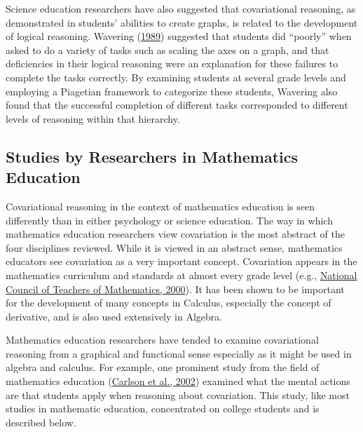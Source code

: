\documentclass[11pt]{umnthesis}
\begin{document}
Science education researchers have also suggested that covariational reasoning, as demonstrated in students' abilities to create graphs, is related to the development of logical reasoning. Wavering (\protect\hyperlink{ref-wavering:1989}{1989}) suggested that students did ``poorly'' when asked to do a variety of tasks such as scaling the axes on a graph, and that deficiencies in their logical reasoning were an explanation for these failures to complete the tasks correctly. By examining students at several grade levels and employing a Piagetian framework to categorize these students, Wavering also found that the successful completion of different tasks corresponded to different levels of reasoning within that hierarchy.

\hypertarget{studies-by-researchers-in-mathematics-education}{%
\subsection{Studies by Researchers in Mathematics Education}\label{studies-by-researchers-in-mathematics-education}}

Covariational reasoning in the context of mathematics education is seen differently than in either psychology or science education. The way in which mathematics education researchers view covariation is the most abstract of the four disciplines reviewed. While it is viewed in an abstract sense, mathematics educators see covariation as a very important concept. Covariation appears in the mathematics curriculum and standards at almost every grade level (e.g., \protect\hyperlink{ref-nctm:2000}{National Council of Teachers of Mathematics, 2000}). It has been shown to be important for the development of many concepts in Calculus, especially the concept of derivative, and is also used extensively in Algebra.

Mathematics education researchers have tended to examine covariational reasoning from a graphical and functional sense especially as it might be used in algebra and calculus. For example, one prominent study from the field of mathematics education (\protect\hyperlink{ref-carlson:2002}{Carlson et al., 2002}) examined what the mental actions are that students apply when reasoning about covariation. This study, like most studies in mathematic education, concentrated on college students and is described below.
\end{document}
